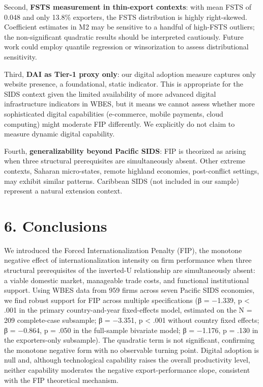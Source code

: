 \documentclass[
  12pt]{article}
\begin{document}
Second, \textbf{FSTS measurement in thin-export contexts}: with mean
FSTS of 0.048 and only 13.8\% exporters, the FSTS distribution is highly
right-skewed. Coefficient estimates in M2 may be sensitive to a handful
of high-FSTS outliers; the non-significant quadratic results should be
interpreted cautiously. Future work could employ quantile regression or
winsorization to assess distributional sensitivity.

Third, \textbf{DAI as Tier-1 proxy only}: our digital adoption measure
captures only website presence, a foundational, static indicator. This
is appropriate for the SIDS context given the limited availability of
more advanced digital infrastructure indicators in WBES, but it means we
cannot assess whether more sophisticated digital capabilities
(e-commerce, mobile payments, cloud computing) might moderate FIP
differently. We explicitly do not claim to measure dynamic digital
capability.

Fourth, \textbf{generalizability beyond Pacific SIDS}: FIP is theorized
as arising when three structural prerequisites are simultaneously
absent. Other extreme contexts, Saharan micro-states, remote highland
economies, post-conflict settings, may exhibit similar patterns.
Caribbean SIDS (not included in our sample) represent a natural
extension context.

\hypertarget{conclusions}{%
\section{6. Conclusions}\label{conclusions}}

We introduced the Forced Internationalization Penalty (FIP), the
monotone negative effect of internationalization intensity on firm
performance when three structural prerequisites of the inverted-U
relationship are simultaneously absent: a viable domestic market,
manageable trade costs, and functional institutional support. Using WBES
data from 959 firms across seven Pacific SIDS economies, we find robust
support for FIP across multiple specifications (β = −1.339, p
\textless{} .001 in the primary country-and-year fixed-effects model,
estimated on the N = 209 complete-case subsample; β = −3.351, p
\textless{} .001 without country fixed effects; β = −0.864, p = .050 in
the full-sample bivariate model; β = −1.176, p = .130 in the
exporters-only subsample). The quadratic term is not significant,
confirming the monotone negative form with no observable turning point.
Digital adoption is null and, although technological capability raises
the overall productivity level, neither capability moderates the
negative export-performance slope, consistent with the FIP theoretical
mechanism.
\end{document}
